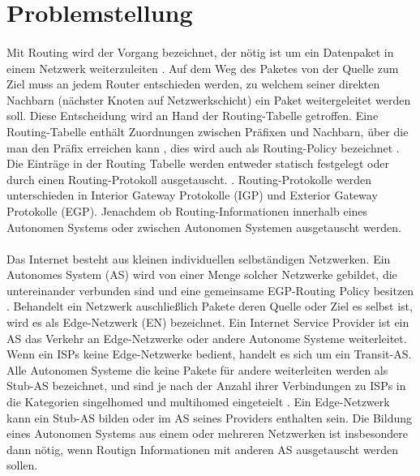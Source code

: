 \section{Problemstellung}
\paragraph{}
Mit Routing wird der Vorgang bezeichnet, der nötig ist um ein Datenpaket in einem Netzwerk weiterzuleiten \cite{Mahorta:2002:IR}. Auf dem Weg des Paketes von der Quelle zum Ziel muss an jedem Router entschieden werden, zu welchem seiner direkten Nachbarn (nächster Knoten auf Netzwerkschicht) ein Paket weitergeleitet werden soll. Diese Entscheidung wird an Hand der Routing-Tabelle getroffen. Eine Routing-Tabelle enthält Zuordnungen zwischen Präfixen und Nachbarn, über die man den Präfix erreichen kann \cite{Mahorta:2002:IR}, dies wird auch als Routing-Policy bezeichnet \cite{hawkinson:1996:autnomousSystems}. Die Einträge in der Routing Tabelle werden entweder statisch festgelegt oder durch einen Routing-Protokoll ausgetauscht. \cite{Tanenbaum:2003:CN}. Routing-Protokolle werden unterschieden in Interior Gateway Protokolle (IGP) und Exterior Gateway Protokolle (EGP). Jenachdem ob Routing-Informationen innerhalb eines Autonomen Systems oder zwischen Autonomen Systemen ausgetauscht werden. %

\paragraph{}
Das Internet besteht aus kleinen individuellen selbständigen Netzwerken. Ein Autonomes System (AS) wird von einer Menge solcher Netzwerke gebildet, die untereinander verbunden sind und eine gemeinsame EGP-Routing Policy besitzen \cite{hawkinson:1996:autnomousSystems}. Behandelt ein Netzwerk auschließlich Pakete deren Quelle oder Ziel es selbst ist,  wird es als Edge-Netzwerk (EN) bezeichnet. Ein Internet Service Provider ist ein AS das Verkehr an Edge-Netzwerke oder andere Autonome Systeme weiterleitet. Wenn ein ISPs keine Edge-Netzwerke bedient, handelt es sich um ein Transit-AS. Alle Autonomen Systeme die keine Pakete für andere weiterleiten werden als Stub-AS bezeichnet, und sind je nach der Anzahl ihrer Verbindungen zu ISPs in die Kategorien singelhomed und multihomed eingeteielt \cite{Mahorta:2002:IR}. Ein Edge-Netzwerk kann ein Stub-AS bilden oder im AS seines Providers enthalten sein. Die Bildung eines Autonomen Systems aus einem oder mehreren Netzwerken ist insbesondere dann nötig, wenn Routign Informationen mit anderen AS ausgetauscht werden sollen.

